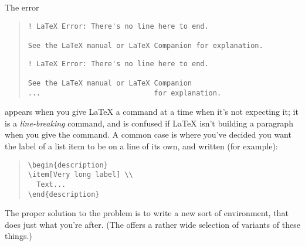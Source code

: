 The error
\begin{quote}
\begin{wideversion}
\begin{verbatim}
! LaTeX Error: There's no line here to end.

See the LaTeX manual or LaTeX Companion for explanation.
\end{verbatim}
\end{wideversion}
\begin{narrowversion}
\begin{verbatim}
! LaTeX Error: There's no line here to end.

See the LaTeX manual or LaTeX Companion
...                           for explanation.
\end{verbatim}
\end{narrowversion}
\end{quote}
appears when you give \LaTeX{} a \texttt{\bsbs } command at a time
when it's not expecting it; it is a \emph{line-breaking} command, and
is confused if \LaTeX{} isn't building a paragraph when you give the
command.  A common case is where you've decided you want the label of
a list item to be on a line of its own, and written (for example):
\begin{quote}
\begin{verbatim}
\begin{description}
\item[Very long label] \\
  Text...
\end{description}
\end{verbatim}
\end{quote}

The proper solution to the problem is to write a new sort of
 environment, that does just what you're after.  (The
\nothtml{~---}
offers a rather wide selection of variants of these things.)

